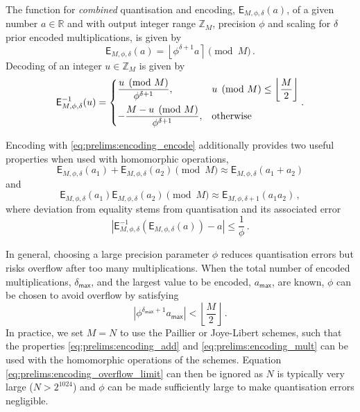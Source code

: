 The function for \textit{combined} quantisation and encoding, $\mathsf{E}_{M,\phi,\delta}(a)$, of a given number $a \in \mathbb{R}$ and with output integer range $\mathbb{Z}_M$, precision $\phi$ and scaling for $\delta$ prior encoded multiplications, is given by
\begin{equation}\label{eq:prelims:encoding_encode}
    \mathsf{E}_{M,\phi,\delta}(a) = \left\lfloor \phi^{\delta+1} a \right\rceil \pmod{M}\,.
\end{equation}
Decoding of an integer $u \in \mathbb{Z}_M$ is given by
\begin{equation}\label{eq:prelims:encoding_decode}
    \mathsf{E}^{-1}_{M,\phi,\delta}(u)=
    \begin{dcases}
        \frac{u \pmod{M}}{\phi^{\delta+1}}, & u \pmod{M} \leq \left\lfloor\frac{M}{2}\right\rfloor \\
        -\frac{M - u \pmod{M}}{\phi^{\delta+1}}, & \text{otherwise}
    \end{dcases}.
\end{equation}

Encoding with \eqref{eq:prelims:encoding_encode} additionally provides two useful properties when used with homomorphic operations,
\begin{equation}\label{eq:prelims:encoding_add}
    \mathsf{E}_{M,\phi,\delta}(a_1) + \mathsf{E}_{M,\phi,\delta}(a_2) \pmod{M} \approx \mathsf{E}_{M,\phi,\delta}(a_1+a_2)
\end{equation}
and
\begin{equation}\label{eq:prelims:encoding_mult}
        \mathsf{E}_{M,\phi,\delta}(a_1)\mathsf{E}_{M,\phi,\delta}(a_2) \pmod{M} \approx \mathsf{E}_{M,\phi,\delta+1}(a_1a_2)\,,
\end{equation}
where deviation from equality stems from quantisation and its associated error
\begin{equation}
    \left|\mathsf{E}^{-1}_{M,\phi,\delta}\left(\mathsf{E}_{M,\phi,\delta}(a)\right) - a\right| \leq \frac{1}{\phi}\,.
\end{equation}

In general, choosing a large precision parameter $\phi$ reduces quantisation errors but risks overflow after too many multiplications. When the total number of encoded multiplications, $\delta_{\mathsf{max}}$, and the largest value to be encoded, $a_{\mathsf{max}}$, are known, $\phi$ can be chosen to avoid overflow by satisfying
\begin{equation}\label{eq:prelims:encoding_overflow_limit}
    \left|\phi^{\delta_{\mathsf{max}}+1}a_{\mathsf{max}}\right| < \left\lfloor \frac{M}{2} \right\rfloor\,.
\end{equation}
In practice, we set $M=N$ to use the Paillier or Joye-Libert schemes, such that the properties \eqref{eq:prelims:encoding_add} and \eqref{eq:prelims:encoding_mult} can be used with the homomorphic operations of the schemes. Equation \eqref{eq:prelims:encoding_overflow_limit} can then be ignored as $N$ is typically very large ($N>2^{1024}$) and $\phi$ can be made sufficiently large to make quantisation errors negligible.